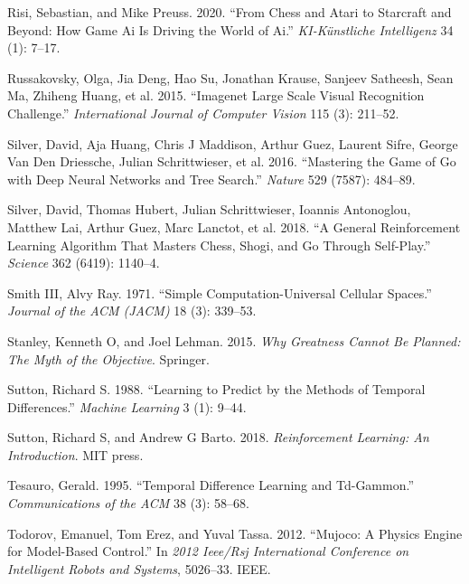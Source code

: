 \documentclass[
  12pt,
  openany]{book}
\newlength{\cslhangindent}
\newenvironment{cslreferences}%
  {\setlength{\parindent}{0pt}%
  \everypar{\setlength{\hangindent}{\cslhangindent}}\ignorespaces}%
  {\par}
\begin{document}
\begin{cslreferences}
\leavevmode\hypertarget{ref-risi2020chess}{}%
Risi, Sebastian, and Mike Preuss. 2020. ``From Chess and Atari to Starcraft and Beyond: How Game Ai Is Driving the World of Ai.'' \emph{KI-Künstliche Intelligenz} 34 (1): 7--17.

\leavevmode\hypertarget{ref-russakovsky2015imagenet}{}%
Russakovsky, Olga, Jia Deng, Hao Su, Jonathan Krause, Sanjeev Satheesh, Sean Ma, Zhiheng Huang, et al. 2015. ``Imagenet Large Scale Visual Recognition Challenge.'' \emph{International Journal of Computer Vision} 115 (3): 211--52.

\leavevmode\hypertarget{ref-silver2016mastering}{}%
Silver, David, Aja Huang, Chris J Maddison, Arthur Guez, Laurent Sifre, George Van Den Driessche, Julian Schrittwieser, et al. 2016. ``Mastering the Game of Go with Deep Neural Networks and Tree Search.'' \emph{Nature} 529 (7587): 484--89.

\leavevmode\hypertarget{ref-silver2018general}{}%
Silver, David, Thomas Hubert, Julian Schrittwieser, Ioannis Antonoglou, Matthew Lai, Arthur Guez, Marc Lanctot, et al. 2018. ``A General Reinforcement Learning Algorithm That Masters Chess, Shogi, and Go Through Self-Play.'' \emph{Science} 362 (6419): 1140--4.

\leavevmode\hypertarget{ref-smith1971simple}{}%
Smith III, Alvy Ray. 1971. ``Simple Computation-Universal Cellular Spaces.'' \emph{Journal of the ACM (JACM)} 18 (3): 339--53.

\leavevmode\hypertarget{ref-stanley2015greatness}{}%
Stanley, Kenneth O, and Joel Lehman. 2015. \emph{Why Greatness Cannot Be Planned: The Myth of the Objective}. Springer.

\leavevmode\hypertarget{ref-sutton1988learning}{}%
Sutton, Richard S. 1988. ``Learning to Predict by the Methods of Temporal Differences.'' \emph{Machine Learning} 3 (1): 9--44.

\leavevmode\hypertarget{ref-sutton2018reinforcement}{}%
Sutton, Richard S, and Andrew G Barto. 2018. \emph{Reinforcement Learning: An Introduction}. MIT press.

\leavevmode\hypertarget{ref-tesauro1995temporal}{}%
Tesauro, Gerald. 1995. ``Temporal Difference Learning and Td-Gammon.'' \emph{Communications of the ACM} 38 (3): 58--68.

\leavevmode\hypertarget{ref-todorov2012mujoco}{}%
Todorov, Emanuel, Tom Erez, and Yuval Tassa. 2012. ``Mujoco: A Physics Engine for Model-Based Control.'' In \emph{2012 Ieee/Rsj International Conference on Intelligent Robots and Systems}, 5026--33. IEEE.


\end{cslreferences}
\end{document}
